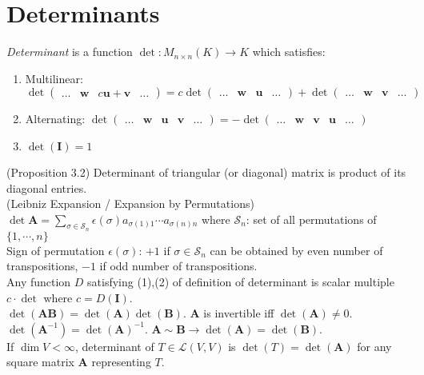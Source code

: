 \documentclass{article}
\theoremstyle{definition}
\begin{document}
\section{Determinants}
\textit{Determinant} is a function $\det:M_{n\times n}(K)\rightarrow K$ which satisfies:
\begin{enumerate}
    \item Multilinear: $\det\begin{pmatrix}
        \hdots & \mathbf{w} & c\mathbf{u}+\mathbf{v} & \hdots
    \end{pmatrix}=c\det\begin{pmatrix}
        \hdots & \mathbf{w} & \mathbf{u} & \hdots
    \end{pmatrix}+\det\begin{pmatrix}
        \hdots & \mathbf{w} & \mathbf{v} & \hdots
    \end{pmatrix}$
    \item Alternating: $\det\begin{pmatrix}
        \hdots & \mathbf{w} & \mathbf{u} & \mathbf{v} & \hdots
    \end{pmatrix}=-\det\begin{pmatrix}
        \hdots & \mathbf{w} & \mathbf{v} & \mathbf{u} & \hdots
    \end{pmatrix}$
    \item $\det(\mathbf{I})=1$
\end{enumerate}
(Proposition 3.2) Determinant of triangular (or diagonal) matrix is product of its diagonal entries.\\
(Leibniz Expansion / Expansion by Permutations) $\det\mathbf{A}=\sum_{\sigma\in\mathcal{S}_{n}}\epsilon(\sigma)a_{\sigma(1)1}\cdots a_{\sigma(n)n}$ where $\mathcal{S}_{n}$: set of all permutations of $\{1,\cdots,n\}$\\
Sign of permutation $\epsilon(\sigma)$: $+1$ if $\sigma\in\mathcal{S}_{n}$ can be obtained by even number of transpositions, $-1$ if odd number of transpositions.\\
Any function $D$ satisfying (1),(2) of definition of determinant is scalar multiple $c\cdot\det$ where $c=D(\mathbf{I})$.\\
$\det(\mathbf{AB})=\det(\mathbf{A})\det(\mathbf{B})$. $\mathbf{A}$ is invertible iff $\det(\mathbf{A})\neq 0$. $\det(\mathbf{A}^{-1})=\det(\mathbf{A})^{-1}$. $\mathbf{A}\sim\mathbf{B}\longrightarrow\det(\mathbf{A})=\det(\mathbf{B})$.\\
If $\dim V<\infty$, determinant of $T\in\mathscr{L}(V,V)$ is $\det(T)=\det(\mathbf{A})$ for any square matrix $\mathbf{A}$ representing $T$.\\
\end{document}
